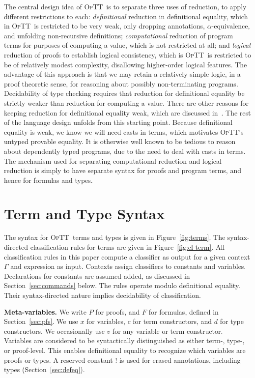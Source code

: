 \documentclass[preprint,natbib]{sigplanconf}
\newcommand{\optt}{\textsc{OpTT}}
\newcommand{\bang}[0]{\texttt{!}}
\begin{document}
The central design idea of \optt\ is to separate three uses of
reduction, to apply different restrictions to each:
\emph{definitional} reduction in definitional equality, which in
\optt\ is restricted to be very weak, only dropping annotations,
$\alpha$-equivalence, and unfolding non-recursive definitions;
\emph{computational} reduction of program terms for purposes of
computing a value, which is not restricted at all; and \emph{logical}
reduction of proofs to establish logical consistency, which is \optt\
is restricted to be of relatively modest complexity, disallowing
higher-order logical features.  The advantage of this approach is that
we may retain a relatively simple logic, in a proof theoretic sense,
for reasoning about possibly non-terminating programs.  Decidability
of type checking requires that reduction for definitional equality be
strictly weaker than reduction for computing a value.  There are other
reasons for keeping reduction for definitional equality weak, which
are discussed in~\cite{optt}.  The rest of the language design unfolds
from this starting point.  Because definitional equality is weak, we
know we will need casts in terms, which motivates \optt's untyped
provable equality.  It is otherwise well known to be tedious to reason
about dependently typed programs, due to the need to deal with casts
in terms.  The mechanism used for separating computational reduction
and logical reduction is simply to have separate syntax for proofs and
program terms, and hence for formulas and types.  

\section{Term and Type Syntax}
\label{sec:terms}

The syntax for \optt\ terms and types is given in
Figure~\ref{fig:terms}.  The syntax-directed classification rules for
terms are given in Figure~\ref{fig:cl-term}.  All classification rules
in this paper compute a classifier as output for a given context
$\Gamma$ and expression as input.  Contexts assign classifiers to
constants and variables.  Declarations for constants are assumed
added, as discussed in Section~\ref{sec:commands} below.  The rules
operate modulo definitional equality.  Their syntax-directed nature
implies decidability of classification.

\textbf{Meta-variables.} We write $P$ for
proofs, and $F$ for formulas, defined in Section~\ref{sec:pfs}.  We
use $x$ for variables, $c$ for term constructors, and $d$ for type
constructors.  We occasionally use $v$ for any variable or term
constructor.  Variables are considered to be syntactically
distinguished as either term-, type-, or proof-level.  This enables
definitional equality to recognize which variables are proofs or
types.  A reserved constant $\bang$ is used for erased annotations,
including types (Section~\ref{sec:defeq}).  
\end{document}
